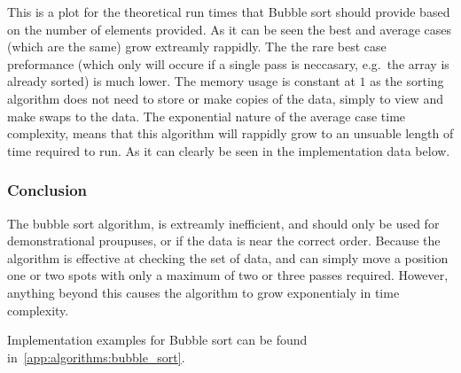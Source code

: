 \documentclass{subfile}
\begin{document}
\begin{multicols}{2}

     This is a plot for the theoretical run times that Bubble sort should
     provide based on the number of elements provided. As it can be seen the
     best and average cases (which are the same) grow extreamly rappidly. The
     the rare best case preformance (which only will occure if a single pass is
     neccasary, e.g.\ the array is already sorted) is much lower. The memory
     usage is constant at $1$ as the sorting algorithm does not need to store
     or make copies of the data, simply to view and make swaps to the data. The
     exponential nature of the average case time complexity, means that this
     algorithm will rappidly grow to an unsuable length of time required to
     run. As it can clearly be seen in the implementation data below.

     \subsubsection{Conclusion}\label{ssub:conclusion}
     
     The bubble sort algorithm, is extreamly inefficient, and should only be
     used for demonstrational proupuses, or if the data is near the correct
     order. Because the algorithm is effective at checking the set of data, and
     can simply move a position one or two spots with only a maximum of two or
     three passes required. However, anything beyond this causes the algorithm
     to grow exponentialy in time complexity.

     Implementation examples for Bubble sort can be found in~\ref{app:algorithms:bubble_sort}.
   \end{multicols}
\end{document}
